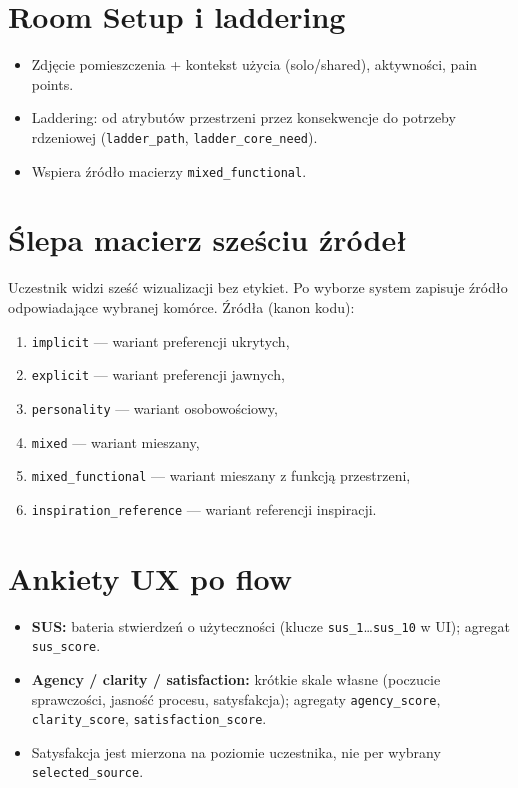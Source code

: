 \section{Room Setup i laddering}
\label{app:b:sec:room}

\begin{itemize}
  \item Zdjęcie pomieszczenia + kontekst użycia (solo/shared), aktywności, pain points.
  \item Laddering: od atrybutów przestrzeni przez konsekwencje do potrzeby rdzeniowej (\texttt{ladder\_path}, \texttt{ladder\_core\_need}).
  \item Wspiera źródło macierzy \texttt{mixed\_functional}.
\end{itemize}

\section{Ślepa macierz sześciu źródeł}
\label{app:b:sec:macierz}

Uczestnik widzi sześć wizualizacji bez etykiet. Po wyborze system zapisuje źródło odpowiadające wybranej komórce. Źródła (kanon kodu):

\begin{enumerate}
  \item \texttt{implicit} --- wariant preferencji ukrytych,
  \item \texttt{explicit} --- wariant preferencji jawnych,
  \item \texttt{personality} --- wariant osobowościowy,
  \item \texttt{mixed} --- wariant mieszany,
  \item \texttt{mixed\_functional} --- wariant mieszany z funkcją przestrzeni,
  \item \texttt{inspiration\_reference} --- wariant referencji inspiracji.
\end{enumerate}

\section{Ankiety UX po flow}
\label{app:b:sec:ux}

\begin{itemize}
  \item \textbf{SUS:} bateria stwierdzeń o użyteczności (klucze \texttt{sus\_1}\ldots\texttt{sus\_10} w UI); agregat \texttt{sus\_score}.
  \item \textbf{Agency / clarity / satisfaction:} krótkie skale własne (poczucie sprawczości, jasność procesu, satysfakcja); agregaty \texttt{agency\_score}, \texttt{clarity\_score}, \texttt{satisfaction\_score}.
  \item Satysfakcja jest mierzona na poziomie uczestnika, nie per wybrany \texttt{selected\_source}.
\end{itemize}
